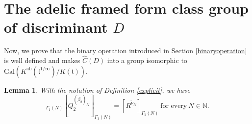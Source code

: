 \documentclass[reqno,11pt]{article}
\theoremstyle{plain} %
\newtheorem{lemma}[theorem]{\indent\sc Lemma}
\theoremstyle{definition} %
\begin{document}
\section {The adelic framed form class group of discriminant $D$}\label{mainsection}

Now, we prove that the binary operation introduced in Section \ref{binaryoperation} is well defined and makes $\widehat{C}(D)$ into a group isomorphic to
$\mathrm{Gal}\left(K^\mathrm{ab}(\mathfrak{t}^{1/\infty})/K(\mathfrak{t})\right)$.

\begin{lemma}\label{compatible}
With the notation of Definition \ref{explicit}, we have
\begin{equation*}
[Q_1^{(\widetilde{\beta}_1)_N}]_{\Gamma_1(N)}
[Q_2^{(\widetilde{\beta}_2)_N}]_{\Gamma_1(N)}
=[R^{\widetilde{\nu}_N}]_{\Gamma_1(N)}
~\textrm{for every}~N\in\mathbb{N}.
\end{equation*}
\end{lemma}
\end{document}
